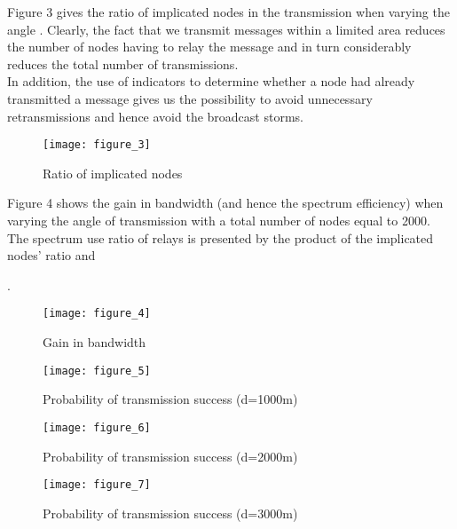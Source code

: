 \documentclass{IEEEtran}
\begin{document}
Figure 3 gives the ratio of implicated nodes in the transmission
when varying the angle . Clearly, the fact that we transmit
messages within a limited area reduces the number of nodes having to
relay the message and in turn
considerably reduces the total number of transmissions.\\
In addition, the use of indicators to determine whether a node had
already transmitted a message gives us the possibility to avoid
unnecessary retransmissions and hence avoid the broadcast storms.

\begin{figure}[!htbp]
  \begin{center}
\texttt{[image: figure\_3]}
  \end{center}
  \caption{Ratio of implicated nodes}
\end{figure}
Figure 4 shows the gain in bandwidth (and hence the spectrum
efficiency) when varying the angle of transmission  with a
total number of nodes equal to 2000. The spectrum use ratio of
relays is presented by the product of the implicated nodes' ratio
and
    
.

\begin{figure}[!htbp]
  \begin{center}
\texttt{[image: figure\_4]}
  \end{center}
  \caption{Gain in bandwidth}
\end{figure}

\begin{figure}[!htbp]
  \begin{center}
\texttt{[image: figure\_5]}
  \end{center}
  \caption{Probability of transmission success (d=1000m)}
\end{figure}


\begin{figure}[!htbp]
  \begin{center}
\texttt{[image: figure\_6]}
  \end{center}
  \caption{Probability of transmission success (d=2000m)}
\end{figure}


\begin{figure}[!htbp]
  \begin{center}
\texttt{[image: figure\_7]}
  \end{center}
  \caption{Probability of transmission success (d=3000m)}
\end{figure}
\end{document}
